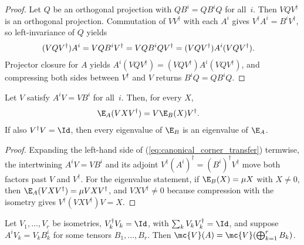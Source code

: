 \begin{proof}
    \leanok
    Let $Q$ be an orthogonal projection with $QB^i=QB^iQ$ for all~$i$.
    Then $VQV^\dagger$ is an orthogonal projection. Commutation of
    $VV^\dagger$ with each $A^i$ gives $V^\dagger A^i=B^iV^\dagger$, so
    left-invariance of $Q$ yields
    \begin{align}
        (VQV^\dagger)A^i
         & =VQB^iV^\dagger
        =VQB^iQV^\dagger
        =(VQV^\dagger)A^i(VQV^\dagger).
        \notag
    \end{align}
    Projector closure for $A$ yields
    $A^i(VQV^\dagger)=(VQV^\dagger)A^i(VQV^\dagger)$, and compressing both
    sides between $V^\dagger$ and $V$ returns $B^iQ=QB^iQ$.
\end{proof}

\begin{lemma}
    \label{lem:transfer_map_corner_intertwine}
    \leanok
    Let $V$ satisfy $A^iV=VB^i$ for all~$i$. Then, for every $X$,
    \begin{align}
        \E_A(VXV^\dagger)
         & =V\E_B(X)V^\dagger.
        \label{eq:canonical_corner_transfer}
    \end{align}
    If also $V^\dagger V=\Id$, then every eigenvalue of $\E_B$ is an
    eigenvalue of $\E_A$.
\end{lemma}

\begin{proof}
    \leanok
    Expanding the left-hand side of (\ref{eq:canonical_corner_transfer})
    termwise, the intertwining $A^iV=VB^i$ and its adjoint
    $V^\dagger(A^i)^\dagger=(B^i)^\dagger V^\dagger$ move both factors past
    $V$ and $V^\dagger$. For the eigenvalue statement, if
    $\E_B(X)=\mu X$ with $X\neq0$, then
    $\E_A(VXV^\dagger)=\mu VXV^\dagger$, and $VXV^\dagger\neq0$ because
    compression with the isometry gives $V^\dagger(VXV^\dagger)V=X$.
\end{proof}

\begin{lemma}
    \label{lem:mpv_partition_isometries}
    \leanok
    Let $V_1,\ldots,V_r$ be isometries, $V_k^\dagger V_k=\Id$, with
    $\sum_kV_kV_k^\dagger=\Id$, and suppose $A^iV_k=V_kB_k^i$ for some
    tensors $B_1,\ldots,B_r$. Then
    $\mc{V}(A)=\mc{V}(\bigoplus_{k=1}^rB_k)$.
\end{lemma}

